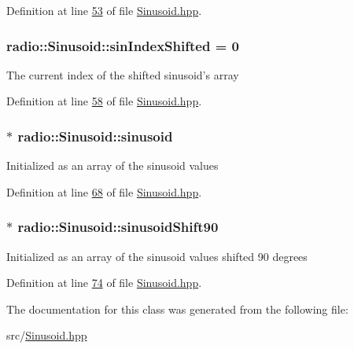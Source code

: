 Definition at line \hyperlink{Sinusoid_8hpp_source_l00053}{53} of file \hyperlink{Sinusoid_8hpp_source}{Sinusoid.\+hpp}.

\hypertarget{classradio_1_1Sinusoid_a4acf2add824249c39046fe87f9a64f93}{
\subsubsection[{sin\+Index\+Shifted}]{ radio\+::\+Sinusoid\+::sin\+Index\+Shifted = 0\hspace{0.3cm}{\ttfamily [protected]}}}\label{classradio_1_1Sinusoid_a4acf2add824249c39046fe87f9a64f93}
The current index of the shifted sinusoid's array 

Definition at line \hyperlink{Sinusoid_8hpp_source_l00058}{58} of file \hyperlink{Sinusoid_8hpp_source}{Sinusoid.\+hpp}.

\hypertarget{classradio_1_1Sinusoid_a56556c3d3e08d1c9481c18e087ff1c85}{
\subsubsection[{sinusoid}]{$\ast$ radio\+::\+Sinusoid\+::sinusoid\hspace{0.3cm}{\ttfamily [protected]}}}\label{classradio_1_1Sinusoid_a56556c3d3e08d1c9481c18e087ff1c85}
Initialized as an array of the sinusoid values 

Definition at line \hyperlink{Sinusoid_8hpp_source_l00068}{68} of file \hyperlink{Sinusoid_8hpp_source}{Sinusoid.\+hpp}.

\hypertarget{classradio_1_1Sinusoid_a556db1dca1d5af3d9c6ba2d51f9e3cf8}{
\subsubsection[{sinusoid\+Shift90}]{$\ast$ radio\+::\+Sinusoid\+::sinusoid\+Shift90\hspace{0.3cm}{\ttfamily [protected]}}}\label{classradio_1_1Sinusoid_a556db1dca1d5af3d9c6ba2d51f9e3cf8}
Initialized as an array of the sinusoid values shifted 90 degrees 

Definition at line \hyperlink{Sinusoid_8hpp_source_l00074}{74} of file \hyperlink{Sinusoid_8hpp_source}{Sinusoid.\+hpp}.



The documentation for this class was generated from the following file\+:\begin{DoxyCompactItemize}
\item 
src/\hyperlink{Sinusoid_8hpp}{Sinusoid.\+hpp}\end{DoxyCompactItemize}
